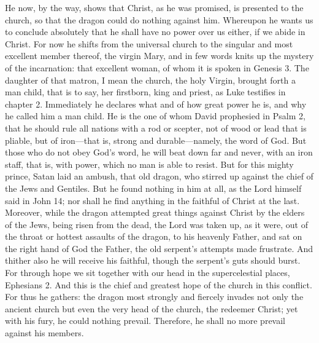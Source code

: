 He now, by the way, shows that Christ, as he was promised, is presented to the church, so that the dragon could do nothing against him. Whereupon he wants us to conclude absolutely that he shall have no power over us either, if we abide in Christ. For now he shifts from the universal church to the singular and most excellent member thereof, the virgin Mary, and in few words knits up the mystery of the incarnation: that excellent woman, of whom it is spoken in Genesis 3. The daughter of that matron, I mean the church, the holy Virgin, brought forth a man child, that is to say, her firstborn, king and priest, as Luke testifies in chapter 2. Immediately he declares what and of how great power he is, and why he called him a man child. He is the one of whom David prophesied in Psalm 2, that he should rule all nations with a rod or scepter, not of wood or lead that is pliable, but of iron—that is, strong and durable—namely, the word of God. But those who do not obey God’s word, he will beat down far and never, with an iron staff, that is, with power, which no man is able to resist. But for this mighty prince, Satan laid an ambush, that old dragon, who stirred up against the chief of the Jews and Gentiles. But he found nothing in him at all, as the Lord himself said in John 14; nor shall he find anything in the faithful of Christ at the last. Moreover, while the dragon attempted great things against Christ by the elders of the Jews, being risen from the dead, the Lord was taken up, as it were, out of the throat or hottest assaults of the dragon, to his heavenly Father, and sat on the right hand of God the Father, the old serpent’s attempts made frustrate. And thither also he will receive his faithful, though the serpent’s guts should burst. For through hope we sit together with our head in the supercelestial places, Ephesians 2. And this is the chief and greatest hope of the church in this conflict. For thus he gathers: the dragon most strongly and fiercely invades not only the ancient church but even the very head of the church, the redeemer Christ; yet with his fury, he could nothing prevail. Therefore, he shall no more prevail against his members.


